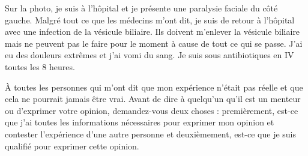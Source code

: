Sur la photo, je suis à l'hôpital et je présente une paralysie faciale du côté
gauche. Malgré tout ce que les médecins m'ont dit, je suis de retour à l'hôpital
avec une infection de la vésicule biliaire. Ils doivent m'enlever la vésicule
biliaire mais ne peuvent pas le faire pour le moment à cause de tout ce qui se
passe. J'ai eu des douleurs extrêmes et j'ai vomi du sang. Je suis sous
antibiotiques en IV toutes les 8 heures.

À toutes les personnes qui m'ont dit que mon expérience n'était pas réelle et
que cela ne pourrait jamais être vrai. Avant de dire à quelqu'un qu'il est un
menteur ou d'exprimer votre opinion, demandez-vous deux choses : premièrement,
est-ce que j'ai toutes les informations nécessaires pour exprimer mon opinion et
contester l'expérience d'une autre personne et deuxièmement, est-ce que je suis
qualifié pour exprimer cette opinion.
